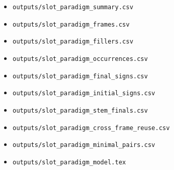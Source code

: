 \begin{itemize}
  \item \texttt{outputs/slot\_paradigm\_summary.csv}
  \item \texttt{outputs/slot\_paradigm\_frames.csv}
  \item \texttt{outputs/slot\_paradigm\_fillers.csv}
  \item \texttt{outputs/slot\_paradigm\_occurrences.csv}
  \item \texttt{outputs/slot\_paradigm\_final\_signs.csv}
  \item \texttt{outputs/slot\_paradigm\_initial\_signs.csv}
  \item \texttt{outputs/slot\_paradigm\_stem\_finals.csv}
  \item \texttt{outputs/slot\_paradigm\_cross\_frame\_reuse.csv}
  \item \texttt{outputs/slot\_paradigm\_minimal\_pairs.csv}
  \item \texttt{outputs/slot\_paradigm\_model.tex}
\end{itemize}
